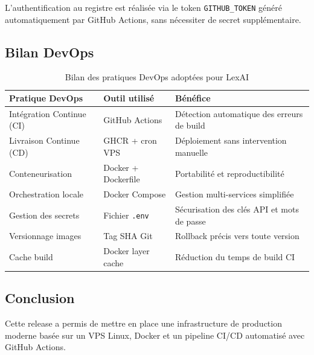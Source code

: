 \vspace{0.5em}

L’authentification au registre est réalisée via le token \texttt{GITHUB\_TOKEN} généré automatiquement par GitHub Actions, sans nécessiter de secret supplémentaire.

\subsection{Bilan DevOps}

\begin{table}[H]
\centering
\small
\renewcommand{\arraystretch}{1.3}
\begin{tabular}{|>{\RaggedRight\arraybackslash}p{3.5cm}|>{\RaggedRight\arraybackslash}p{4cm}|>{\RaggedRight\arraybackslash}p{5cm}|}
\hline
\textbf{Pratique DevOps} & \textbf{Outil utilisé} & \textbf{Bénéfice} \\
\hline
Intégration Continue (CI) & GitHub Actions & Détection automatique des erreurs de build \\
\hline
Livraison Continue (CD) & GHCR + cron VPS & Déploiement sans intervention manuelle \\
\hline
Conteneurisation & Docker + Dockerfile & Portabilité et reproductibilité \\
\hline
Orchestration locale & Docker Compose & Gestion multi-services simplifiée \\
\hline
Gestion des secrets & Fichier \texttt{.env} & Sécurisation des clés API et mots de passe \\
\hline
Versionnage images & Tag SHA Git & Rollback précis vers toute version \\
\hline
Cache build & Docker layer cache & Réduction du temps de build CI \\
\hline
\end{tabular}
\caption{Bilan des pratiques DevOps adoptées pour LexAI}
\label{tab:devops-bilan}
\end{table}

\newpage

\subsection{Conclusion}
Cette release a permis de mettre en place une infrastructure de production moderne basée sur un VPS Linux, Docker et un pipeline CI/CD automatisé avec GitHub Actions.

